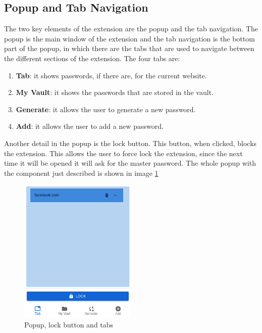 \subsection {Popup and Tab Navigation}

The two key elements of the extension are the popup and the tab navigation. The popup is the main window of the extension and the tab navigation is the bottom part of the popup, in which there are the tabs that are used to navigate between the different sections of the extension. The four tabs are:

\begin{enumerate}
    \item \textbf{Tab}: it shows passwords, if there are, for the current website.
    \item \textbf{My Vault}: it shows the passwords that are stored in the vault.
    \item \textbf{Generate}: it allows the user to generate a new password.
    \item \textbf{Add}: it allows the user to add a new password.
\end{enumerate}


Another detail in the popup is the lock button. This button, when clicked, blocks the extension. This allows the user to force lock the extension, since the next time it will be opened it will ask for the master password.
The whole popup with the component just described is shown in image \ref*{fig:popup-lock-tab}

\begin{figure}[h!]
    \centering
    \vspace{0.5cm}
    \includegraphics[width=0.5\textwidth]{images/extension/popup-lock-tab.png}
    \caption{Popup, lock button and tabs}
    \label{fig:popup-lock-tab} %
\end{figure}

